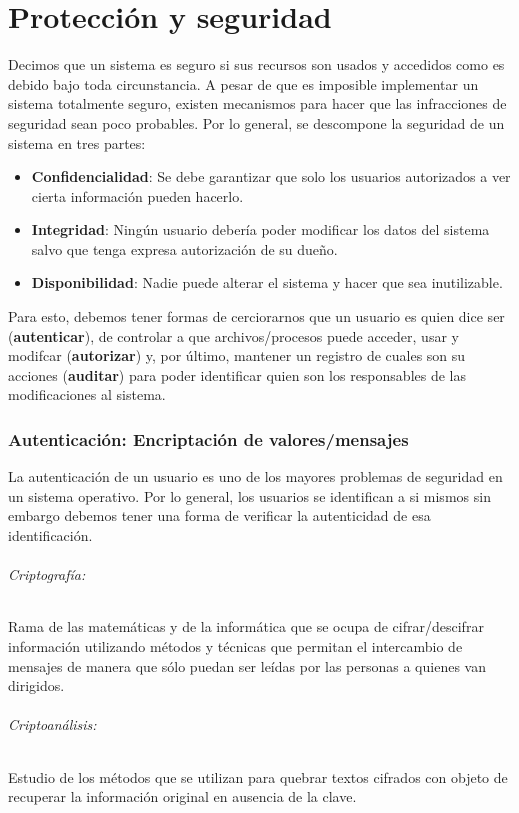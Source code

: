 \part{Protección y seguridad}
Decimos que un sistema es seguro si sus recursos son usados y accedidos como es debido bajo toda circunstancia. A pesar de que es imposible implementar un sistema totalmente seguro, existen mecanismos para hacer que las infracciones de seguridad sean poco probables. Por lo general, se descompone la seguridad de un sistema en tres partes:
\begin{itemize}
	\item \textbf{Confidencialidad}: Se debe garantizar que solo los usuarios autorizados a ver cierta información pueden hacerlo.
	\item \textbf{Integridad}: Ningún usuario debería poder modificar los datos del sistema salvo que tenga expresa autorización de su dueño.
	\item \textbf{Disponibilidad}: Nadie puede alterar el sistema y hacer que sea inutilizable. 
\end{itemize}

Para esto, debemos tener formas de cerciorarnos que un usuario es quien dice ser (\textbf{autenticar}), de controlar a que archivos/procesos puede acceder, usar y modifcar (\textbf{autorizar}) y, por último, mantener un registro de cuales son su acciones (\textbf{auditar}) para poder identificar quien son los responsables de las modificaciones al sistema.

\section{Autenticación: Encriptación de valores/mensajes}
La autenticación de un usuario es uno de los mayores problemas de seguridad en un sistema operativo. Por lo general, los usuarios se identifican a si mismos sin embargo debemos tener una forma de verificar la autenticidad de esa identificación.

\paragraph{Criptografía:} Rama de las matemáticas y de la informática que se ocupa de cifrar/descifrar información utilizando métodos y técnicas que permitan el intercambio de mensajes de manera que sólo puedan ser leídas por las personas a quienes van dirigidos.

\paragraph{Criptoanálisis:} Estudio de los métodos que se utilizan para quebrar textos cifrados con objeto de recuperar la información original en ausencia de la clave.

